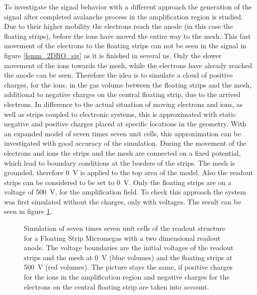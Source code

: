 \documentclass[
a4paper,                                %
twoside,                                %
BCOR1.4cm,                      %
10pt,                           %
headings=normal,                %
headsepline,                    %
clearplainpage, %
final,                                  %
div=14,
parskip=full,
openright,
bibliography=toc
]{scrreprt}
\begin{document}
To investigate the signal behavior with a different approach the generation of the signal after completed avalanche process in the amplification region is studied. Due to their higher mobility the electrons reach the anode (in this case the floating strips), before the ions have moved the entire way to the mesh. This fast movement of the electrons to the floating strips can not be seen in the signal in figure \ref{fsmm_2DRO_sig} as it is finished in several ns. Only the slower movement of the ions towards the mesh, while the electrons have already reached the anode can be seen. Therefore the idea is to simulate  a cloud of positive charges, for the ions, in the gas volume between the floating strips and the mesh, additional to negative charges on the central floating strip, due to the arrived electrons. In difference to the actual situation of moving electrons and ions, as well as strips coupled to electronic systems, this is approximated with static negative and positive charges placed at specific locations in the geometry. With an expanded model of seven times seven unit cells, this approximation can be investigated with good accuracy of the simulation. During the movement of the electrons and ions the strips and the mesh are connected on a fixed potential, which lead to boundary conditions at the borders of the strips. The mesh is grounded, therefore \SI{0}{\V} is applied to the top area of the model. Also the readout strips can be considered to be set to \SI{0}{\V}. Only the floating strips are on a voltage of \SI{+500}{\V}, for the amplification field. To check this approach the system was first simulated without the charges, only with voltages. The result can be seen in figure \ref{fsmm_onlyVoltages}.

\begin{figure}[H]
	\centering
	\qquad
	\caption{Simulation of seven times seven unit cells of the readout structure for a Floating Strip Micromegas with a two dimensional readout anode. The voltage boundaries are the initial voltages of the readout strips and the mesh at \SI{0}{\V} (blue volumes) and the floating strips at \SI{+500}{\V} (red volumes). The picture stays the same, if positive charges for the ions in the amplification region and negative charges for the electrons on the central floating strip are taken into account.}
	\label{fsmm_onlyVoltages}
\end{figure}
\end{document}
